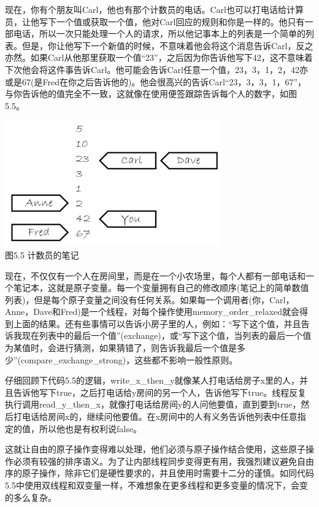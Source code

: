 现在，你有个朋友叫Carl，他也有那个计数员的电话。Carl也可以打电话给计算员，让他写下一个值或获取一个值，他对Carl回应的规则和你是一样的。他只有一部电话，所以一次只能处理一个人的请求，所以他记事本上的列表是一个简单的列表。但是，你让他写下一个新值的时候，不意味着他会将这个消息告诉Carl，反之亦然。如果Carl从他那里获取一个值“23”，之后因为你告诉他写下42，这不意味着下次他会将这件事告诉Carl。他可能会告诉Carl任意一个值，23，3，1，2，42亦或是67(是Fred在你之后告诉他的)。他会很高兴的告诉Carl“23，3，3，1，67”，与你告诉他的值完全不一致，这就像在使用便签跟踪告诉每个人的数字，如图5.5。

\begin{center}
    \includegraphics[width=0.7\textwidth]{content/chapter05/images/5-5.png}\\
    图5.5 计数员的笔记
\end{center}

现在，不仅仅有一个人在房间里，而是在一个小农场里，每个人都有一部电话和一个笔记本，这就是原子变量。每一个变量拥有自己的修改顺序(笔记上的简单数值列表)，但是每个原子变量之间没有任何关系。如果每一个调用者(你，Carl，Anne，Dave和Fred)是一个线程，对每个操作使用memory\_order\_relaxed就会得到上面的结果。还有些事情可以告诉小房子里的人，例如：“写下这个值，并且告诉我现在列表中的最后一个值”(exchange)，或“写下这个值，当列表的最后一个值为某值时，会进行猜测，如果猜错了，则告诉我最后一个值是多少”(compare\_exchange\_strong)，这些都不影响一般性原则。

仔细回顾下代码5.5的逻辑，write\_x\_then\_y就像某人打电话给房子x里的人，并且告诉他写下true，之后打电话给y房间的另一个人，告诉他写下true。线程反复执行调用read\_y\_then\_x，就像打电话给房间y的人问他要值，直到要到true，然后打电话给房间x的，继续问他要值。在x房间中的人有义务告诉他列表中任意指定的值，所以他也是有权利说false。

这就让自由的原子操作变得难以处理，他们必须与原子操作结合使用，这些原子操作必须有较强的排序语义。为了让内部线程同步变得更有用，我强烈建议避免自由序的原子操作，除非它们是硬性要求的，并且使用时需要十二分的谨慎。如同代码5.5中使用双线程和双变量一样，不难想象在更多线程和更多变量的情况下，会变的多么复杂。

